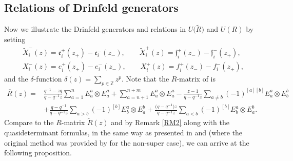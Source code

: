 \documentclass[10pt,a4paper]{amsart}
\numberwithin{equation}{section}
\begin{document}
\subsection{Relations of Drinfeld generators}\label{sec5.2}

Now we illustrate the Drinfeld generators and relations in $U\bigl(\widetilde{R}\bigr)$ and $U(R)$ by setting
\begin{gather*}
 \widetilde{X}^{-}_i(z)=\mathfrak{e}^+_{i}(z_+)-\mathfrak{e}^-_{i}(z_-),\qquad
 \widetilde{X}^{+}_i(z)=\mathfrak{f}^+_{i}(z_-)-\mathfrak{f}^-_{i}(z_+),\\
 X^{-}_i(z)=e^+_{i}(z_+)-e^-_{i}(z_-),\qquad
 X^{+}_i(z)=f^+_{i}(z_-)-f^-_{i}(z_+),
\end{gather*}
and the $\delta$-function
$ \delta(z)=\sum_{p\in\mathbb{Z}}z^p$.
Note that the $R$-matrix of  is
\begin{align*}
 \overline{R}(z)={}&\frac{q^{-1}-zq}{q-q^{-1}z}\sum\limits_{a=1 }^{n}E^a_a\otimes E^a_a+\sum\limits_{a=n+1 }^{n+m}E^a_a\otimes E^a_a-\frac{z-1}{q-q^{-1}z}\sum\limits_{a\neq b}(-1)^{[a][b]}E^a_a\otimes E^b_b\nonumber\\
 &+\frac{q-q^{-1}}{q-q^{-1}z}\sum\limits_{a>b}(-1)^{[b]}E^a_b\otimes E^b_a+\frac{\bigl(q-q^{-1}\bigr)z}{q-q^{-1}z}\sum\limits_{a<b }(-1)^{[b]}E^a_b\otimes E^b_a.
\end{align*}
Compare to the $R$-matrix $\widetilde{R}(z)$ and by Remark \ref{RM2} along with the quasideterminant formulas, in the same way as presented in \cite{JSKW,HBKD} and \cite{YZC} (where the original method was provided by \cite{JDIB} for the non-super case), we can arrive at the following proposition.
\end{document}
